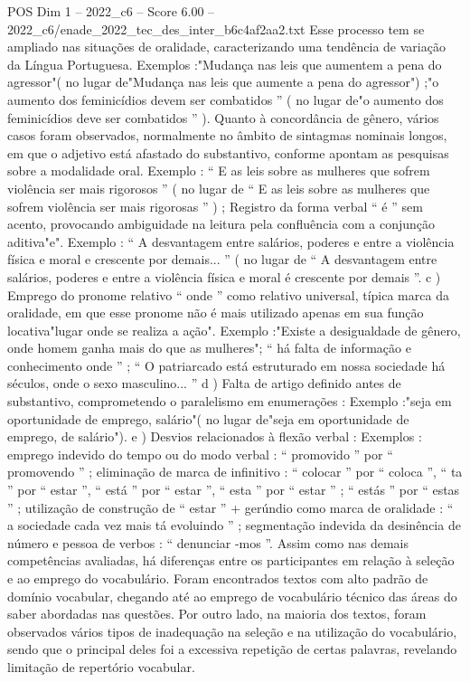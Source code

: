 \begin{textsample}{POS Dim 1 – 2022\_c6 – Score 6.00 – 2022\_c6/enade\_2022\_tec\_des\_inter\_b6c4af2aa2.txt}
Esse processo tem se ampliado nas situações de oralidade, caracterizando uma tendência de variação da Língua Portuguesa.
Exemplos :"Mudança nas leis que aumentem a pena do agressor"( no lugar de"Mudança nas leis que aumente a pena do agressor") ;"o aumento dos feminicídios devem ser combatidos ” ( no lugar de"o aumento dos feminicídios deve ser combatidos ” ).
Quanto à concordância de gênero, vários casos foram observados, normalmente no âmbito de sintagmas nominais longos, em que o adjetivo está afastado do substantivo, conforme apontam as pesquisas sobre a modalidade oral.
Exemplo : “ E as leis sobre as mulheres que sofrem violência ser mais rigorosos ” ( no lugar de “ E as leis sobre as mulheres que sofrem violência ser mais rigorosas ” ) ; Registro da forma verbal “ é ” sem acento, provocando ambiguidade na leitura pela confluência com a conjunção aditiva"e".
Exemplo : “ A desvantagem entre salários, poderes e entre a violência física e moral e crescente por demais... ” ( no lugar de “ A desvantagem entre salários, poderes e entre a violência física e moral é crescente por demais ”. c ) Emprego do pronome relativo “ onde ” como relativo universal, típica marca da oralidade, em que esse pronome não é mais utilizado apenas em sua função locativa"lugar onde se realiza a ação".
Exemplo :"Existe a desigualdade de gênero, onde homem ganha mais do que as mulheres"; “ há falta de informação e conhecimento onde ” ; “ O patriarcado está estruturado em nossa sociedade há séculos, onde o sexo masculino... ” d ) Falta de artigo definido antes de substantivo, comprometendo o paralelismo em enumerações : Exemplo :"seja em oportunidade de emprego, salário"( no lugar de"seja em oportunidade de emprego, de salário"). e ) Desvios relacionados à flexão verbal : Exemplos : emprego indevido do tempo ou do modo verbal : “ promovido ” por “ promovendo ” ; eliminação de marca de infinitivo : “ colocar ” por “ coloca ”, “ ta ” por “ estar ”, “ está ” por “ estar ”, “ esta ” por “ estar ” ; “ estás ” por “ estas ” ; utilização de construção de “ estar ” + gerúndio como marca de oralidade : “ a sociedade cada vez mais tá evoluindo ” ; segmentação indevida da desinência de número e pessoa de verbos : “ denunciar -mos ”.
Assim como nas demais competências avaliadas, há diferenças entre os participantes em relação à seleção e ao emprego do vocabulário.
Foram encontrados textos com alto padrão de domínio vocabular, chegando até ao emprego de vocabulário técnico das áreas do saber abordadas nas questões.
Por outro lado, na maioria dos textos, foram observados vários tipos de inadequação na seleção e na utilização do vocabulário, sendo que o principal deles foi a excessiva repetição de certas palavras, revelando limitação de repertório vocabular.

\end{textsample}
